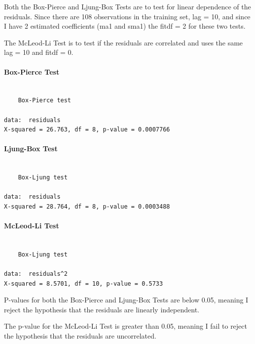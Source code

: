 \documentclass[
  letterpaper,
  DIV=11,
  numbers=noendperiod]{scrartcl}
\let\oldparagraph\paragraph
\renewcommand{\paragraph}[1]{\oldparagraph{#1}\mbox{}}
\begin{document}
Both the Box-Pierce and Ljung-Box Tests are to test for linear
dependence of the residuals. Since there are 108 observations in the
training set, lag = 10, and since I have 2 estimated coefficients (ma1
and sma1) the fitdf = 2 for these two tests.

The McLeod-Li Test is to test if the residuals are correlated and uses
the same lag = 10 and fitdf = 0.

\hypertarget{box-pierce-test}{%
\paragraph{Box-Pierce Test}\label{box-pierce-test}}

\begin{verbatim}

    Box-Pierce test

data:  residuals
X-squared = 26.763, df = 8, p-value = 0.0007766
\end{verbatim}

\hypertarget{ljung-box-test}{%
\paragraph{Ljung-Box Test}\label{ljung-box-test}}

\begin{verbatim}

    Box-Ljung test

data:  residuals
X-squared = 28.764, df = 8, p-value = 0.0003488
\end{verbatim}

\hypertarget{mcleod-li-test}{%
\paragraph{McLeod-Li Test}\label{mcleod-li-test}}

\begin{verbatim}

    Box-Ljung test

data:  residuals^2
X-squared = 8.5701, df = 10, p-value = 0.5733
\end{verbatim}

P-values for both the Box-Pierce and Ljung-Box Tests are below 0.05,
meaning I reject the hypothesis that the residuals are linearly
independent.

The p-value for the McLeod-Li Test is greater than 0.05, meaning I fail
to reject the hypothesis that the residuals are uncorrelated.
\end{document}
